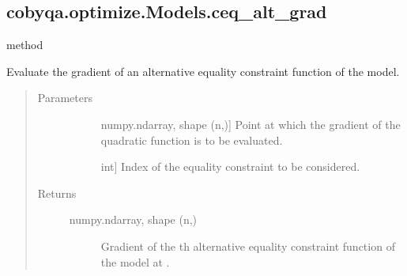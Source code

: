 \documentclass[letterpaper,10pt,english]{sphinxmanual}
\begin{document}
\begin{fulllineitems}
\begin{fulllineitems}
\begin{quote}
\begin{description}
\begin{description}
\end{description}

\end{description}\end{quote}

\end{fulllineitems}



\subsection{cobyqa.optimize.Models.ceq\_alt\_grad}
\label{\detokenize{refs/generated/cobyqa.optimize.Models.ceq_alt_grad:cobyqa-optimize-models-ceq-alt-grad}}\label{\detokenize{refs/generated/cobyqa.optimize.Models.ceq_alt_grad::doc}}
\sphinxAtStartPar
method

\begin{fulllineitems}
\label{\detokenize{refs/generated/cobyqa.optimize.Models.ceq_alt_grad:cobyqa.optimize.Models.ceq_alt_grad}}
\sphinxAtStartPar
Evaluate the gradient of an alternative equality constraint function of
the model.
\begin{quote}\begin{description}
\item[{Parameters}] \leavevmode\begin{description}
\item[{}] \leavevmode{[}numpy.ndarray, shape (n,){]}
\sphinxAtStartPar
Point at which the gradient of the quadratic function is to be
evaluated.

\item[{}] \leavevmode{[}int{]}
\sphinxAtStartPar
Index of the equality constraint to be considered.

\end{description}

\item[{Returns}] \leavevmode\begin{description}
\item[{numpy.ndarray, shape (n,)}] \leavevmode
\sphinxAtStartPar
Gradient of the \sphinxhyphen{}th alternative equality constraint function of
the model at .


\end{description}
\end{description}
\end{quote}
\end{fulllineitems}
\end{fulllineitems}
\end{document}
